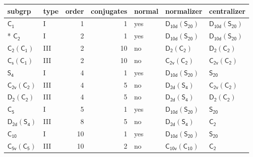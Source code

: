 \documentclass[10pt,a4paper]{article}
\numberwithin{equation}{section}
\newcommand{\grp}[1]{\mathsf{#1}}
\begin{document}
{\small\begin{longtable}{@{}llrrlll@{}}\toprule
subgrp & type & order & conjugates & normal & normalizer & centralizer\\\midrule\endhead
\bottomrule\endfoot\endlastfoot
\href{../../../rotation/data/pdf/C1.pdf}{$\grp{C_{1}}$} & I & 1 & 1 & yes & \href{D10d-S20.pdf}{$\grp{D_{10d}}(\grp{S_{20}})$} & \href{D10d-S20.pdf}{$\grp{D_{10d}}(\grp{S_{20}})$}\\*
\href{../../../rotation/data/pdf/C2.pdf}{$\grp{C_{2}}$} & I & 2 & 1 & yes & \href{D10d-S20.pdf}{$\grp{D_{10d}}(\grp{S_{20}})$} & \href{D10d-S20.pdf}{$\grp{D_{10d}}(\grp{S_{20}})$}\\
\href{C2-C1.pdf}{$\grp{C_{2}}(\grp{C_{1}})$} & III & 2 & 10 & no & \href{D2-C2.pdf}{$\grp{D_{2}}(\grp{C_{2}})$} & \href{D2-C2.pdf}{$\grp{D_{2}}(\grp{C_{2}})$}\\
\href{C1v-C1.pdf}{$\grp{C_{s}}(\grp{C_{1}})$} & III & 2 & 10 & no & \href{C2v-C2.pdf}{$\grp{C_{2v}}(\grp{C_{2}})$} & \href{C2v-C2.pdf}{$\grp{C_{2v}}(\grp{C_{2}})$}\\
\href{../../../rotation/data/pdf/S4.pdf}{$\grp{S_{4}}$} & I & 4 & 1 & yes & \href{D10d-S20.pdf}{$\grp{D_{10d}}(\grp{S_{20}})$} & \href{../../../rotation/data/pdf/S20.pdf}{$\grp{S_{20}}$}\\
\href{C2v-C2.pdf}{$\grp{C_{2v}}(\grp{C_{2}})$} & III & 4 & 5 & no & \href{D2d-S4.pdf}{$\grp{D_{2d}}(\grp{S_{4}})$} & \href{C2v-C2.pdf}{$\grp{C_{2v}}(\grp{C_{2}})$}\\
\href{D2-C2.pdf}{$\grp{D_{2}}(\grp{C_{2}})$} & III & 4 & 5 & no & \href{D2d-S4.pdf}{$\grp{D_{2d}}(\grp{S_{4}})$} & \href{D2-C2.pdf}{$\grp{D_{2}}(\grp{C_{2}})$}\\
\href{../../../rotation/data/pdf/C5.pdf}{$\grp{C_{5}}$} & I & 5 & 1 & yes & \href{D10d-S20.pdf}{$\grp{D_{10d}}(\grp{S_{20}})$} & \href{../../../rotation/data/pdf/S20.pdf}{$\grp{S_{20}}$}\\
\href{D2d-S4.pdf}{$\grp{D_{2d}}(\grp{S_{4}})$} & III & 8 & 5 & no & \href{D2d-S4.pdf}{$\grp{D_{2d}}(\grp{S_{4}})$} & \href{../../../rotation/data/pdf/C2.pdf}{$\grp{C_{2}}$}\\
\href{../../../rotation/data/pdf/C10.pdf}{$\grp{C_{10}}$} & I & 10 & 1 & yes & \href{D10d-S20.pdf}{$\grp{D_{10d}}(\grp{S_{20}})$} & \href{../../../rotation/data/pdf/S20.pdf}{$\grp{S_{20}}$}\\
\href{C5v-C5.pdf}{$\grp{C_{5v}}(\grp{C_{5}})$} & III & 10 & 2 & no & \href{C10v-C10.pdf}{$\grp{C_{10v}}(\grp{C_{10}})$} & \href{../../../rotation/data/pdf/C2.pdf}{$\grp{C_{2}}$}\\

\end{longtable}}
\end{document}
